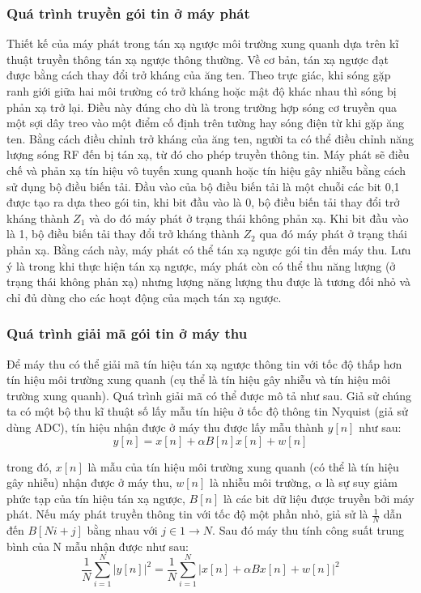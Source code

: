 \documentclass{uetgraduation}
\begin{document}
\subsubsection{Quá trình truyền gói tin ở máy phát}
Thiết kế của máy phát trong tán xạ ngược môi trường xung quanh dựa trên kĩ thuật truyền thông tán xạ ngược thông thường. Về cơ bản, tán xạ ngược đạt được bằng cách thay đổi
trở kháng của ăng ten. Theo trực giác, khi sóng gặp ranh giới giữa hai môi trường có trở kháng hoặc mật độ khác nhau thì sóng bị phản xạ trở lại. Điều này đúng cho dù
là trong trường hợp sóng cơ truyền qua một sợi dây treo vào một điểm cố định trên tường hay sóng điện từ khi gặp ăng ten. Bằng cách điều chỉnh trở kháng của ăng ten, người ta
có thể điều chỉnh năng lượng sóng RF đến bị tán xạ, từ đó cho phép truyền thông tin. Máy phát sẽ điều chế và phản xạ tín hiệu vô tuyến xung quanh hoặc tín hiệu gây nhiễu bằng
cách sử dụng bộ điều biến tải. Đầu vào của bộ điều biến tải là một chuỗi các bit 0,1 được tạo ra dựa theo gói tin, khi bit đầu vào là 0, bộ điều biến tải thay đổi trở kháng
thành $Z_1$ và do đó máy phát ở trạng thái không phản xạ. Khi bit đầu vào là 1, bộ điều biến tải thay đổi trở kháng thành $Z_2$ qua đó máy phát ở trạng thái phản xạ. Bằng cách
này, máy phát có thể tán xạ ngược gói tin đến máy thu. Lưu ý là trong khi thực hiện tán xạ ngược, máy phát còn có thể thu năng lượng (ở trạng thái không phản xạ) nhưng lượng
năng lượng thu được là tương đối nhỏ và chỉ đủ dùng cho các hoạt động của mạch tán xạ ngược.

\subsubsection{Quá trình giải mã gói tin ở máy thu}
Để máy thu có thể giải mã tín hiệu tán xạ ngược thông tin với tốc độ thấp hơn tín hiệu môi trường xung quanh (cụ thể là tín hiệu gây nhiễu và tín hiệu môi trường xung quanh).
Quá trình giải mã có thể được mô tả như sau. Giả sử chúng ta có một bộ thu kĩ thuật số lấy mẫu tín hiệu ở tốc độ thông tin Nyquist (giả sử dùng ADC), tín hiệu nhận được ở máy thu được lấy mẫu
thành $y[n]$ như sau:
\begin{equation}
    y[n] = x[n] + \alpha B[n]x[n] + w[n]
    \label{eq:}
\end{equation}
    
trong đó, $x[n]$ là mẫu của tín hiệu môi trường xung quanh (có thể là tín hiệu gây nhiễu) nhận được ở máy thu, $w[n]$ là nhiễu môi trường, $\alpha$ là sự suy giảm phức tạp của
tín hiệu tán xạ ngược, $B[n]$ là các bit dữ liệu được truyền bởi máy phát. Nếu máy phát truyền thông tin với tốc độ một phần nhỏ, giả sử là $\frac{1}{N}$ dẫn đến $B[Ni + j]$ bằng
nhau với $j \in 1 \to N$. Sau đó máy thu tính công suất trung bình của N mẫu nhận được như sau:
\begin{equation}
    \frac{1}{N}\sum_{i=1}^N|y[n]|^2 = \frac{1}{N}\sum_{i=1}^N|x[n] + \alpha B x[n] + w[n]|^2
\end{equation}
    
\end{document}
